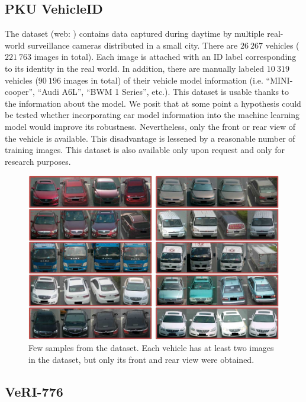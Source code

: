 \subsection{PKU VehicleID}
\label{ssec:DatasetPKUVehicleID}

The  dataset \cite{liu2016deep} (web: \cite{pkuvehicleiddataset}) contains data captured during daytime by multiple real-world surveillance cameras distributed in a small city. There are $26\ 267$ vehicles ($221\ 763$ images in total). Each image is attached with an ID label corresponding to its identity in the real world. In addition, there are manually labeled $10\ 319$ vehicles ($90\ 196$ images in total) of their vehicle model information (i.e. “MINI-cooper”, “Audi A6L”, “BWM 1 Series”, etc.). This dataset is usable thanks to the information about the model. We posit that at some point a hypothesis could be tested whether incorporating car model information into the machine learning model would improve its robustness. Nevertheless, only the front or rear view of the vehicle is available. This disadvantage is lessened by a reasonable number of training images. This dataset is also available only upon request and only for research purposes.

\begin{figure}[t]
    \centerline{\includegraphics[width=0.5\linewidth]{figures/datasets/vehicleid_overview.pdf}}
    \caption[ dataset]{Few samples from the  dataset. Each vehicle has at least two images in the dataset, but only its front and rear view were obtained. }
    \label{fig:DatasetVehicleID}
\end{figure}

\subsection{VeRI-776}
\label{ssec:DatasetVeRI776}

